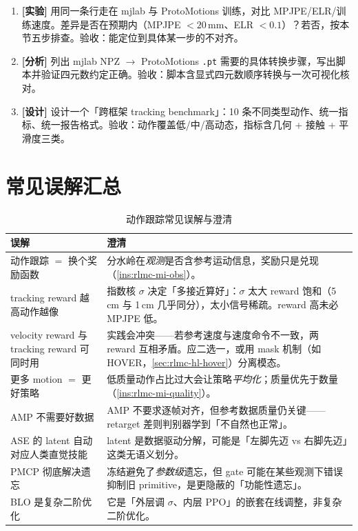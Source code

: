 \begin{practice}[本节练习]
\begin{enumerate}
  \item \textbf{[实验]} 用同一条行走在 mjlab 与 ProtoMotions 训练，对比 MPJPE/ELR/训练速度。差异是否在预期内（MPJPE $<20$\,mm、ELR $<0.1$）？若否，按本节五步排查。验收：能定位到具体某一步的不对齐。
  \item \textbf{[分析]} 列出 mjlab NPZ $\to$ ProtoMotions \verb|.pt| 需要的具体转换步骤，写出脚本并验证四元数约定正确。验收：脚本含显式四元数顺序转换与一次可视化核对。
  \item \textbf{[设计]} 设计一个「跨框架 tracking benchmark」：10 条不同类型动作、统一指标、统一报告格式。验收：动作覆盖低/中/高动态，指标含几何 + 接触 + 平滑度三类。
\end{enumerate}
\end{practice}

\section*{常见误解汇总}
\label{sec:rlmc-mi-misconceptions}

\begin{table}[H]
\centering
\small
\caption{动作跟踪常见误解与澄清}
\label{tab:rlmc-mi-misc}
\begin{tabular}{@{}p{4.6cm}p{8.4cm}@{}}
\toprule
误解 & 澄清 \\
\midrule
动作跟踪 $=$ 换个奖励函数 & 分水岭在\emph{观测}是否含参考运动信息，奖励只是兑现（\cref{ins:rlmc-mi-obs}）。 \\
tracking reward 越高动作越像 & 指数核 $\sigma$ 决定「多接近算好」：$\sigma$ 太大 reward 饱和（5\,cm 与 1\,cm 几乎同分），太小信号稀疏。reward 高未必 MPJPE 低。 \\
velocity reward 与 tracking reward 可同时用 & 实践会冲突——若参考速度与速度命令不一致，两 reward 互相矛盾。应二选一，或用 mask 机制（如 HOVER，\cref{sec:rlmc-hl-hover}）分离模态。 \\
更多 motion $=$ 更好策略 & 低质量动作占比过大会让策略\emph{平均化}；质量优先于数量（\cref{ins:rlmc-mi-quality}）。 \\
AMP 不需要好数据 & AMP 不要求逐帧对齐，但参考数据质量仍关键——retarget 差则判别器学到「不自然也正常」。 \\
ASE 的 latent 自动对应人类直觉技能 & latent 是数据驱动分解，可能是「左脚先迈 vs 右脚先迈」这类无语义划分。 \\
PMCP 彻底解决遗忘 & 冻结避免了\emph{参数级}遗忘，但 gate 可能在某些观测下错误抑制旧 primitive，是更隐蔽的「功能性遗忘」。 \\
BLO 是复杂二阶优化 & 它是「外层调 $\sigma$、内层 PPO」的嵌套在线调整，非复杂二阶优化。 \\
\bottomrule
\end{tabular}
\end{table}

